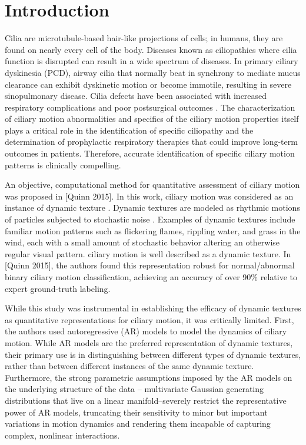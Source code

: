 \section{Introduction}

Cilia are microtubule-based hair-like projections of cells; in humans, they are found on nearly every cell of the body. Diseases known as ciliopathies where cilia function is disrupted can result in a wide spectrum of diseases. In primary ciliary dyskinesia (PCD), airway cilia that normally beat in synchrony to mediate mucus clearance can exhibit dyskinetic motion or become immotile, resulting in severe sinopulmonary disease\cite{o2007diagnosing}. Cilia defects have been associated with increased respiratory complications and poor postsurgical outcomes \cite{nakhleh2012high}. The characterization of ciliary motion abnormalities and specifics of the ciliary motion properties itself plays a critical role in the identification of specific ciliopathy and the determination of prophylactic respiratory therapies that could improve long-term outcomes in patients. Therefore, accurate identification of specific ciliary motion patterns is clinically compelling.

An objective, computational method for quantitative assessment of ciliary motion was proposed in [Quinn 2015]. In this work, ciliary motion was considered as an instance of dynamic texture \cite{saisan2001dynamic}. Dynamic textures are modeled as rhythmic motions of particles subjected to stochastic noise \cite{chen2013automatic}. Examples of dynamic textures include familiar motion patterns such as flickering flames, rippling water, and grass in the wind, each with a small amount of stochastic behavior altering an otherwise regular visual pattern. ciliary motion is well described as a dynamic texture. In [Quinn 2015], the authors found this representation robust for normal/abnormal binary ciliary motion classification, achieving an accuracy of over 90\% relative to expert ground-truth labeling.

While this study was instrumental in establishing the efficacy of dynamic textures as quantitative representations for ciliary motion, it was critically limited. First, the authors used autoregressive (AR) models \cite{hyndman2007higher} to model the dynamics of ciliary motion. While AR models are the preferred representation of dynamic textures, their primary use is in distinguishing between different types of dynamic textures, rather than between different instances of the same dynamic texture. Furthermore, the strong parametric assumptions imposed by the AR models on the underlying structure of the data -- multivariate Gaussian generating distributions that live on a linear manifold--severely restrict the representative power of AR models, truncating their sensitivity to minor but important variations in motion dynamics and rendering them incapable of capturing complex, nonlinear interactions.

